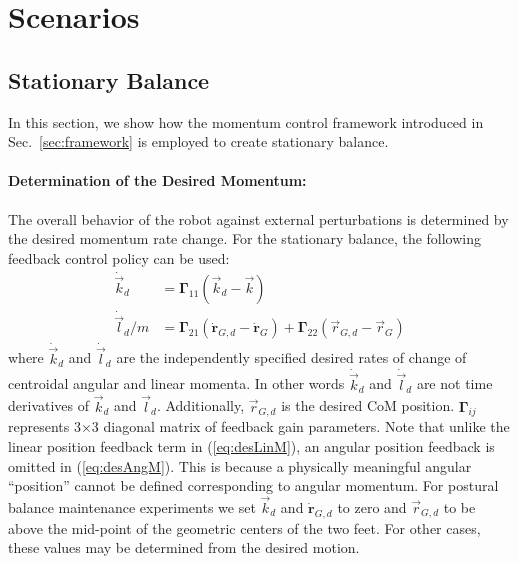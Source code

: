 \documentclass{llncs}
\newcommand{\vdr} {\boldsymbol{\dot{r}}}
\newcommand{\mGamma} {\boldsymbol{\Gamma}}
\newcommand{\vk}{\vec{k}}
\newcommand{\vr}{\vec{r}}
\newcommand{\vdk} {\dot{\vec{k}}}
\newcommand{\vl}{\vec{l}}
\newcommand{\vdl} {\dot{\vec{l}}}
\begin{document}
\section{Scenarios}
\label{sec:scenarios}

\subsection{Stationary Balance}

In this section, we show how the momentum control framework introduced in Sec.~\ref{sec:framework} is employed to create stationary balance.

\paragraph{Determination of the Desired Momentum:}
\label{sec:obj_bal_con}

The overall behavior of the robot against external perturbations
is determined by the desired momentum rate change.
For the stationary balance, the following feedback control policy can be used:
\begin{align}
	\vdk_d &= \mGamma_{11} (\vk_d - \vk) \label{eq:desAngM}\\
	\vdl_d/m &= \mGamma_{21}(\vdr_{G,d}-\vdr_G) + \mGamma_{22}(\vr_{G,d}-\vr_G) \label{eq:desLinM}
\end{align}
where $\vdk_d$ and $\vdl_d$ are the independently specified
desired rates of change of centroidal angular and
linear momenta. In other words $\vdk_d$ and $\vdl_d$ are not time derivatives of $\vk_d$ and $\vl_d$.
Additionally, $\vr_{G,d}$ is the desired CoM position.
$\mGamma_{ij}$ represents 3$\times$3 diagonal matrix of feedback gain parameters.
Note that unlike the linear position feedback term in (\ref{eq:desLinM}), an angular position
feedback is omitted in (\ref{eq:desAngM}). This is because a physically meaningful angular
``position''
cannot be defined corresponding to angular momentum\cite{Wie05}.
For postural balance maintenance experiments we set $\vk_d$ and $\vdr_{G,d}$ to zero
and $\vr_{G,d}$ to be above the mid-point of the geometric centers of the
two feet. For other cases, these values may be determined from the desired motion.
\end{document}
